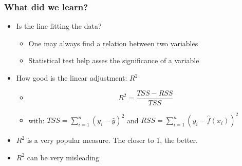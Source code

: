 \documentclass[xcolor=x11names,compress, aspectratio=169]{beamer}
\renewcommand{\(}{\begin{columns}}
\renewcommand{\)}{\end{columns}}
\newcommand{\<}[1]{\begin{column}{#1}}
\renewcommand{\>}{\end{column}}
\begin{document}
\begin{frame} %
\frametitle{What did we learn?}
 \begin{itemize}
  \item<+-> Is the line fitting the data?
   \begin{itemize}
      \item<+->[] One may always find a relation between two variables
      \item<+->[] Statistical test help asses the significance of a variable
  \end{itemize}
  \item<+-> How good is the linear adjustment: $R^2$
  \begin{itemize}
      \item<+->[] $$R^2 = \frac{TSS- RSS}{TSS}$$
      \item<+->[] with:  $TSS= \sum_{i=1}^n (y_i -\bar{y})^2 $ and $RSS= \sum_{i=1}^n (y_i - \widehat{f}(x_i))^2 $
 \end{itemize}
 \item<+-> $R^2$ is a very popular measure. The closer to 1, the better.
 \item<+->  $R^2$  can be very misleading
 \end{itemize}
\end{frame}



\end{document}
